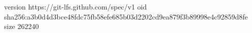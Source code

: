 version https://git-lfs.github.com/spec/v1
oid sha256:a3b0d4d3bce48fdc75fb58efe685b03d2202cd9ea879f3b89998e4c92859d8fe
size 262240
